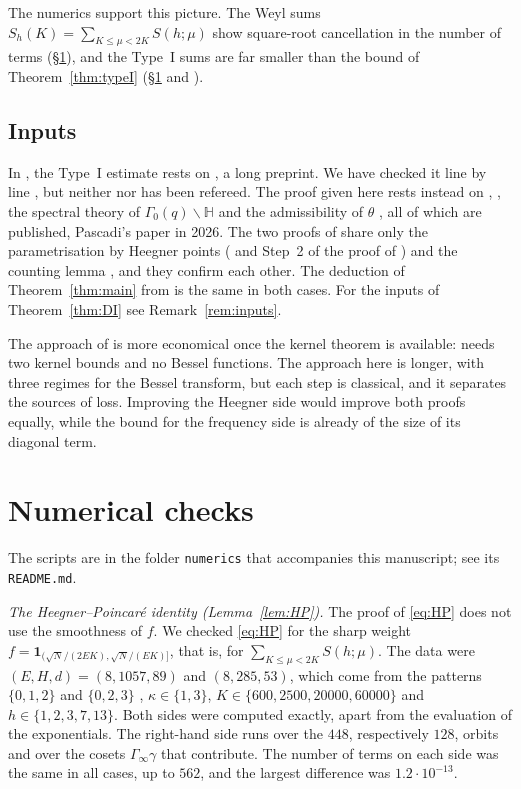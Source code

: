 \documentclass[11pt]{amsart}
\theoremstyle{remark}
\theoremstyle{definition}
\numberwithin{equation}{section}
\newcommand{\Hb}{\mathbb{H}}
\newcommand{\one}{\mathbf{1}}
\begin{document}
The numerics support this picture. The Weyl sums $S_h(K)=\sum_{K\le\mu<2K}S(h;\mu)$ show square-root cancellation in the number of terms (\S\ref{sec:numerics}), and the Type~I sums are far smaller than the bound of Theorem~\ref{thm:typeI} (\S\ref{sec:numerics} and \cite[\S9]{II}).

\subsection{Inputs}
In \cite{II}, the Type~I estimate \cite[Proposition~6.5]{II} rests on \cite[Theorem~8.1]{GM1}, a long preprint. We have checked it line by line \cite{V}, but neither \cite{GM1} nor \cite{V} has been refereed. The proof given here rests instead on \cite[Theorem~2]{DI}, \cite[Theorem~2]{Pas}, the spectral theory of $\Gamma_0(q)\backslash\Hb$ \cite{Iw} and the admissibility of $\theta$ \cite{Kim}, all of which are published, Pascadi's paper in 2026. The two proofs of \cite[Proposition~6.5]{II} share only the parametrisation by Heegner points (\cite[Lemma~6.2]{II} and Step~2 of the proof of \cite[Proposition~6.5]{II}) and the counting lemma \cite[Lemma~6.4]{II}, and they confirm each other. The deduction of Theorem~\ref{thm:main} from \cite[Proposition~6.5]{II} is the same in both cases. For the inputs of Theorem~\ref{thm:DI} see Remark~\ref{rem:inputs}.

The approach of \cite{GM1} is more economical once the kernel theorem is available: \cite[\S6]{II} needs two kernel bounds and no Bessel functions. The approach here is longer, with three regimes for the Bessel transform, but each step is classical, and it separates the sources of loss. Improving the Heegner side would improve both proofs equally, while the bound for the frequency side is already of the size of its diagonal term.

\section{Numerical checks}\label{sec:numerics}

The scripts are in the folder \texttt{numerics} that accompanies this manuscript; see its \texttt{README.md}.

\emph{The Heegner--Poincar\'e identity (Lemma~\ref{lem:HP}).} The proof of \eqref{eq:HP} does not use the smoothness of $f$. We checked \eqref{eq:HP} for the sharp weight $f=\one_{(\sqrt N/(2EK),\sqrt N/(EK)]}$, that is, for $\sum_{K\le\mu<2K}S(h;\mu)$. The data were $(E,H,d)=(8,1057,89)$ and $(8,285,53)$, which come from the patterns $\{0,1,2\}$ and $\{0,2,3\}$ \cite[\S9]{II}, $\kappa\in\{1,3\}$, $K\in\{600,2500,20000,60000\}$ and $h\in\{1,2,3,7,13\}$. Both sides were computed exactly, apart from the evaluation of the exponentials. The right-hand side runs over the $448$, respectively $128$, orbits and over the cosets $\Gamma_\infty\gamma$ that contribute. The number of terms on each side was the same in all cases, up to $562$, and the largest difference was $1.2\cdot10^{-13}$.
\end{document}
